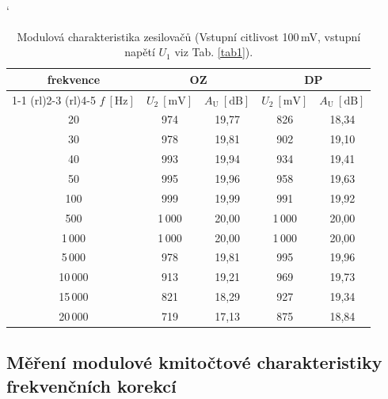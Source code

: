 \documentclass[a4paper, czech]{article}
\begin{document}
\begin{table}[H]
    \centering
    \caption{Modulová charakteristika zesilovačů (Vstupní citlivost 100\,mV, vstupní napětí $U_1$ viz Tab. \ref{tab1}).}
    \catcode`
    \begin{tabular}{ccccc}
        \toprule
        frekvence & \multicolumn{2}{c}{OZ} & \multicolumn{2}{c}{DP} \\
        \cmidrule(rl){1-1}
        \cmidrule(rl){2-3}
        \cmidrule(rl){4-5}
        $f\ [\mathrm{Hz}]$ & $U_2\ [\mathrm{mV}]$ & $A_\mathrm{U}\ [\mathrm{dB}]$ & $U_2\ [\mathrm{mV}]$ & $A_\mathrm{U}\ [\mathrm{dB}]$ \\
        \midrule
        20 & 974 & 19,77 & 826 & 18,34 \\
        30 & 978 & 19,81 & 902 & 19,10 \\
        40 & 993 & 19,94 & 934 & 19,41 \\
        50 & 995 & 19,96 & 958 & 19,63 \\
        100 & 999 & 19,99 & 991 & 19,92 \\
        500 & 1\,000 & 20,00 & 1\,000 & 20,00 \\
        1\,000 & 1\,000 & 20,00 & 1\,000 & 20,00 \\
        5\,000 & 978 & 19,81 & 995 & 19,96 \\
        10\,000 & 913 & 19,21 & 969 & 19,73 \\
        15\,000 & 821 & 18,29 & 927 & 19,34 \\
        20\,000 & 719 & 17,13 & 875 & 18,84 \\
        \bottomrule
    \end{tabular}
\end{table}

\subsection{Měření modulové kmitočtové charakteristiky frekvenčních korekcí}
\end{document}
